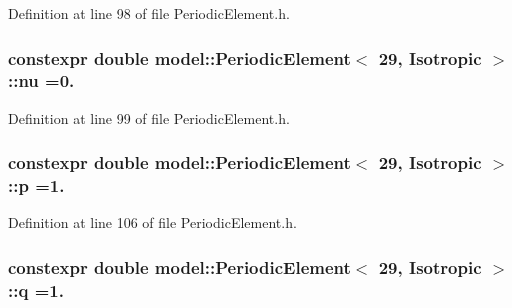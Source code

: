 Definition at line 98 of file Periodic\+Element.\+h.

\hypertarget{structmodel_1_1_periodic_element_3_0129_00_01_isotropic_01_4_a91901c3133017d353fb32a5c021ae12a}{}
\subsubsection[{nu}]{\setlength{\rightskip}{0pt plus 5cm}constexpr double {\bf model\+::\+Periodic\+Element}$<$ 29, {\bf Isotropic} $>$\+::nu =0.\hspace{0.3cm}{\ttfamily [static]}}\label{structmodel_1_1_periodic_element_3_0129_00_01_isotropic_01_4_a91901c3133017d353fb32a5c021ae12a}


Definition at line 99 of file Periodic\+Element.\+h.

\hypertarget{structmodel_1_1_periodic_element_3_0129_00_01_isotropic_01_4_af4905a41079b441ef872b683cceeae70}{}
\subsubsection[{p}]{\setlength{\rightskip}{0pt plus 5cm}constexpr double {\bf model\+::\+Periodic\+Element}$<$ 29, {\bf Isotropic} $>$\+::p =1.\hspace{0.3cm}{\ttfamily [static]}}\label{structmodel_1_1_periodic_element_3_0129_00_01_isotropic_01_4_af4905a41079b441ef872b683cceeae70}


Definition at line 106 of file Periodic\+Element.\+h.

\hypertarget{structmodel_1_1_periodic_element_3_0129_00_01_isotropic_01_4_a53af0529596269a6642b37cd29afe12b}{}
\subsubsection[{q}]{\setlength{\rightskip}{0pt plus 5cm}constexpr double {\bf model\+::\+Periodic\+Element}$<$ 29, {\bf Isotropic} $>$\+::q =1.\hspace{0.3cm}{\ttfamily [static]}}\label{structmodel_1_1_periodic_element_3_0129_00_01_isotropic_01_4_a53af0529596269a6642b37cd29afe12b}


